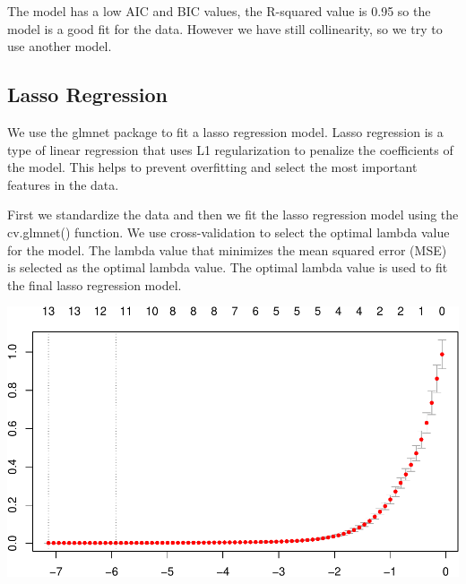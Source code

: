 \documentclass[
]{article}
\newenvironment{Shaded}{\begin{snugshade}}{\end{snugshade}}
\newcommand{\AttributeTok}[1]{\textcolor[rgb]{0.13,0.29,0.53}{#1}}
\newcommand{\CommentTok}[1]{\textcolor[rgb]{0.56,0.35,0.01}{\textit{#1}}}
\newcommand{\ConstantTok}[1]{\textcolor[rgb]{0.56,0.35,0.01}{#1}}
\newcommand{\DecValTok}[1]{\textcolor[rgb]{0.00,0.00,0.81}{#1}}
\newcommand{\FunctionTok}[1]{\textcolor[rgb]{0.13,0.29,0.53}{\textbf{#1}}}
\newcommand{\NormalTok}[1]{#1}
\newcommand{\OtherTok}[1]{\textcolor[rgb]{0.56,0.35,0.01}{#1}}
\newcommand{\SpecialCharTok}[1]{\textcolor[rgb]{0.81,0.36,0.00}{\textbf{#1}}}
\begin{document}
The model has a low AIC and BIC values, the R-squared value is 0.95 so
the model is a good fit for the data. However we have still
collinearity, so we try to use another model.

\subsection{Lasso Regression}\label{lasso-regression}

We use the glmnet package to fit a lasso regression model. Lasso
regression is a type of linear regression that uses L1 regularization to
penalize the coefficients of the model. This helps to prevent
overfitting and select the most important features in the data.

First we standardize the data and then we fit the lasso regression model
using the cv.glmnet() function. We use cross-validation to select the
optimal lambda value for the model. The lambda value that minimizes the
mean squared error (MSE) is selected as the optimal lambda value. The
optimal lambda value is used to fit the final lasso regression model.

\begin{Shaded}
\end{Shaded}

\begin{center}\includegraphics{Statistical_Learning_Final_Report_files/figure-latex/lasso_regression-1} \end{center}
\end{document}

